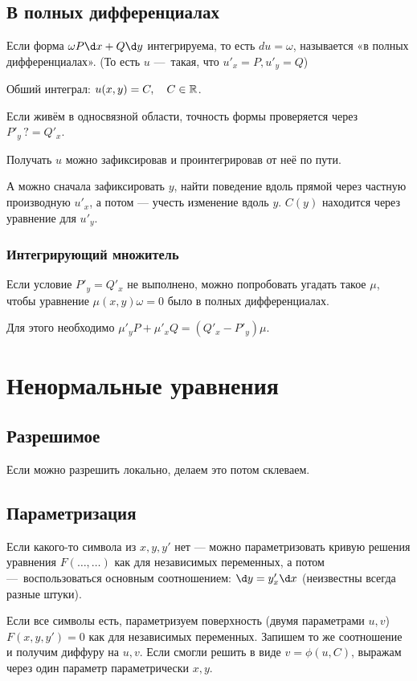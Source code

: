 \documentclass[12pt, a4paper]{article}
\begin{document}
\subsection{В полных дифференциалах}

Если форма $\omega P \d x + Q \d y$ интегрируема, то есть $du = \omega$, называется «в полных дифференциалах». 
(То есть $u$ — такая, что $u'_x = P, u'_y = Q$)

Обший интеграл: $u(x, y) = C, \quad C \in {\mathbb{R}}$.

Если живём в односвязной области, точность формы проверяется через $P'_y \, ?\!\!= Q'_x$.

Получать $u$ можно зафиксировав и проинтегрировав от неё по пути.

А можно сначала зафиксировать $y$, найти поведение вдоль прямой через частную производную $u'_x$,
а потом — учесть изменение вдоль $y$. $C(y)$ находится через уравнение для $u'_y$.


\subsubsection{Интегрирующий множитель}

Если условие $P'_y = Q'_x$ не выполнено, можно попробовать угадать такое $\mu$, чтобы уравнение $\mu(x, y) \omega = 0$ было в полных дифференциалах.

Для этого необходимо $\mu'_y P + \mu'_x Q = (Q'_x - P'_y)\mu$.


\section{Ненормальные уравнения}

\subsection{Разрешимое}

Если можно разрешить локально, делаем это потом склеваем.

\subsection{Параметризация}

Если какого-то символа из $x, y, y'$ нет 
— можно параметризовать кривую решения уравнения $F(…, …)$ как для независимых переменных, 
а потом — воспользоваться основным соотношением: $\d y = y'_x \d x$ (неизвестны всегда разные штуки).

Если все символы есть, параметризуем поверхность (двумя параметрами $u, v$) $F(x, y, y') = 0$ как для независимых переменных.
Запишем то же соотношение и получим диффуру на $u, v$. Если смогли решить в виде $v = \phi(u, C)$, выражам через один параметр параметрически $x, y$.
\end{document}
